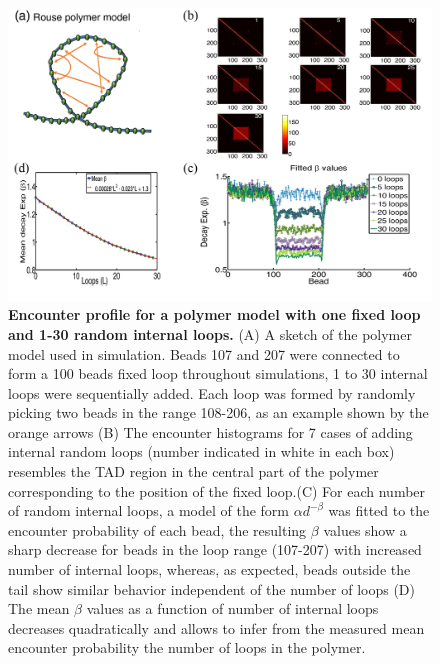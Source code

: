 \documentclass[12pt]{article}
\begin{document}
\begin{figure}[H]
\includegraphics[scale=0.5]{Figure03_OneTADWithTails0To30RandomLoops}
\caption{\textbf{Encounter profile for a polymer model with one fixed loop and 1-30 random internal loops.} (A) A sketch of the polymer model used in simulation. Beads 107 and 207 were connected to form a 100 beads fixed loop throughout simulations, 1 to 30 internal loops were sequentially added. Each loop was formed by randomly picking two beads in the range 108-206, as an example shown by the orange arrows (B) The encounter histograms for 7 cases of adding internal random loops (number indicated in white in each box) resembles the TAD region in the central part of the polymer corresponding to the position of the fixed loop.(C) For each number of random internal loops, a model of the form $\alpha d^{-\beta}$ was fitted to the encounter probability of each bead, the resulting $\beta$ values show a sharp decrease for beads in the loop range (107-207) with increased number of internal loops, whereas, as expected, beads outside the tail show similar behavior independent of the number of loops (D) The mean $\beta$ values as a function of number of internal loops decreases quadratically and allows to infer from the measured mean encounter probability the number of loops in the polymer.}
\label{figure_encounterProfileOneTADWithTails}
\end{figure}
\end{document}
